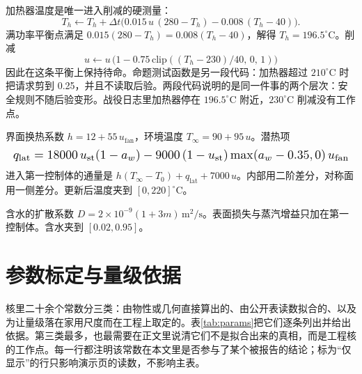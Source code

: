 加热器温度是唯一进入削减的硬测量：
\begin{equation}
T_h\leftarrow T_h+\Delta t\Big(0.015\,u\,(280-T_h)-0.008\,(T_h-40)\Big).
\end{equation}
满功率平衡点满足 \(0.015(280-T_h)=0.008(T_h-40)\)，解得 \(T_h=196.5^\circ\mathrm{C}\)。削减
\begin{equation}
u\leftarrow u\,\big(1-0.75\,\mathrm{clip}((T_h-230)/40,\,0,\,1)\big)
\end{equation}
因此在这条平衡上保持待命。命题测试函数是另一段代码：加热器超过 \(210^\circ\mathrm{C}\) 时把请求剪到 0.25，并且不读取后验。两段代码说明的是同一件事的两个层次：安全规则不随后验变形。战役日志里加热器停在 \(196.5^\circ\mathrm{C}\) 附近，\(230^\circ\mathrm{C}\) 削减没有工作点。

界面换热系数 \(h=12+55\,u_{\mathrm{fan}}\)，环境温度 \(T_\infty=90+95\,u\)。潜热项
\begin{equation}
\resizebox{\columnwidth}{!}{$
q_{\mathrm{lat}}=18000\,u_{\mathrm{st}}(1-a_w)-9000\,(1-u_{\mathrm{st}})\max(a_w-0.35,0)\,u_{\mathrm{fan}}
$}
\end{equation}
进入第一控制体的通量是 \(h(T_\infty-T_0)+q_{\mathrm{lat}}+7000\,u\)。内部用二阶差分，对称面用一侧差分。更新后温度夹到 \([0,220]^\circ\mathrm{C}\)。

含水的扩散系数 \(D=2\times 10^{-9}(1+3m)\,\mathrm{m}^2/\mathrm{s}\)。表面损失与蒸汽增益只加在第一控制体。含水夹到 \([0.02,0.95]\)。

\section{参数标定与量级依据}

核里二十余个常数分三类：由物性或几何直接算出的、由公开表读数拟合的、以及为让量级落在家用尺度而在工程上取定的。表\ref{tab:params}{}把它们逐条列出并给出依据。第三类最多，也最需要在正文里说清它们不是拟合出来的真相，而是工程核的工作点。每一行都注明该常数在本文里是否参与了某个被报告的结论；标为“仅显示”的行只影响演示页的读数，不影响主表。


